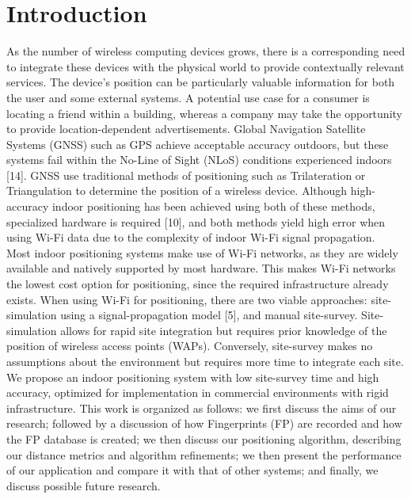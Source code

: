 \documentclass[conference]{IEEEtran}
\begin{document}
\section{Introduction}
As the number of wireless computing devices grows, there is a corresponding need to integrate these devices with the physical world to provide contextually relevant services. The device's position can be particularly valuable information for both the user and some external systems. A potential use case for a consumer is locating a friend within a building, whereas a company may take the opportunity to provide location-dependent advertisements.
Global Navigation Satellite Systems (GNSS) such as GPS achieve acceptable accuracy outdoors, but these systems fail within the No-Line of Sight (NLoS) conditions experienced indoors [14]. GNSS use traditional methods of positioning such as Trilateration or Triangulation to determine the position of a wireless device. Although high-accuracy indoor positioning has been achieved using both of these methods, specialized hardware is required [10], and both methods yield high error when using Wi-Fi data due to the complexity of indoor Wi-Fi signal propagation.\\ 
\indent Most indoor positioning systems make use of Wi-Fi networks, as they are widely available and natively supported by most hardware. This makes Wi-Fi networks the lowest cost option for positioning, since the required infrastructure already exists. When using Wi-Fi for positioning, there are two viable approaches: site-simulation using a signal-propagation model [5], and manual site-survey. Site-simulation allows for rapid site integration but requires prior knowledge of the position of wireless access points (WAPs). Conversely, site-survey makes no assumptions about the environment but requires more time to integrate each site.\\ 
\indent We propose an indoor positioning system with low site-survey time and high accuracy, optimized for implementation in commercial environments with rigid infrastructure.
\indent This work is organized as follows: we first discuss the aims of our research; followed by a discussion of how Fingerprints (FP) are recorded and how the FP database is created; we then discuss our positioning algorithm, describing our distance metrics and algorithm refinements; we then present the performance of our application and compare it with that of other systems; and finally, we discuss possible future research.
\end{document}
